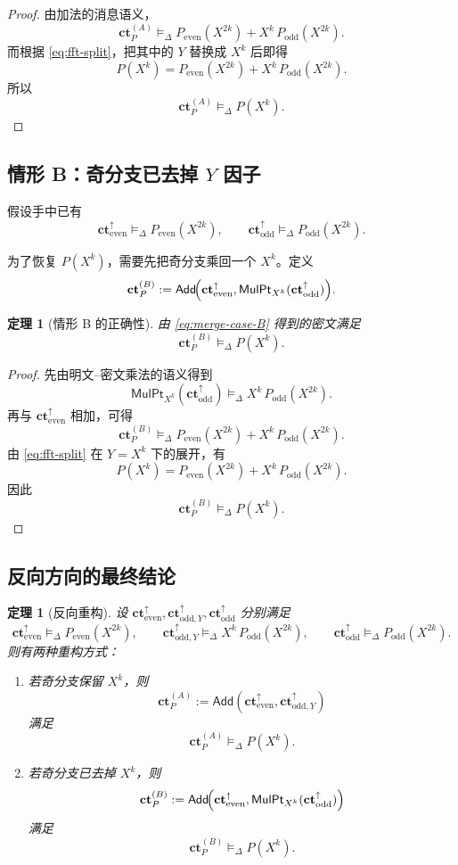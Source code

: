 \documentclass[11pt,a4paper]{ctexart}
\newcommand{\Add}{\mathsf{Add}}
\newcommand{\MulPt}[1]{\mathsf{MulPt}_{#1}}
\newcommand{\ct}{\mathbf{ct}}
\newcommand{\cte}{\mathbf{ct}_{\mathrm{even}}^{\uparrow}}
\newcommand{\ctoy}{\mathbf{ct}_{\mathrm{odd},Y}^{\uparrow}}
\newcommand{\cto}{\mathbf{ct}_{\mathrm{odd}}^{\uparrow}}
\newcommand{\rep}{\mathrel{\vDash_{\Delta}}}
\newtheorem{theorem}[definition]{定理}
\begin{document}
\begin{proof}
由加法的消息语义，
\[
\ct_P^{(A)}
\rep
P_{\mathrm{even}}(X^{2k})+X^k\,P_{\mathrm{odd}}(X^{2k}).
\]
而根据 \eqref{eq:fft-split}，把其中的 \(Y\) 替换成 \(X^k\) 后即得
\[
P(X^k)=P_{\mathrm{even}}(X^{2k})+X^k\,P_{\mathrm{odd}}(X^{2k}).
\]
所以
\[
\ct_P^{(A)} \rep P(X^k).
\]
\end{proof}

\subsection{情形 B：奇分支已去掉 \texorpdfstring{\(Y\)}{Y} 因子}

假设手中已有
\[
\cte \rep P_{\mathrm{even}}(X^{2k}),
\qquad
\cto \rep P_{\mathrm{odd}}(X^{2k}).
\]

为了恢复 \(P(X^k)\)，需要先把奇分支乘回一个 \(X^k\)。定义
\begin{equation}
\ct_P^{(B)}:=\Add\!\Bigl(\cte,\MulPt{X^k}(\cto)\Bigr). \label{eq:merge-case-B}
\end{equation}

\begin{theorem}[情形 B 的正确性]
由 \eqref{eq:merge-case-B} 得到的密文满足
\[
\ct_P^{(B)} \rep P(X^k).
\]
\end{theorem}

\begin{proof}
先由明文--密文乘法的语义得到
\[
\MulPt{X^k}(\cto)\rep X^k\,P_{\mathrm{odd}}(X^{2k}).
\]
再与 \(\cte\) 相加，可得
\[
\ct_P^{(B)}
\rep
P_{\mathrm{even}}(X^{2k})+X^k\,P_{\mathrm{odd}}(X^{2k}).
\]
由 \eqref{eq:fft-split} 在 \(Y=X^k\) 下的展开，有
\[
P(X^k)=P_{\mathrm{even}}(X^{2k})+X^k\,P_{\mathrm{odd}}(X^{2k}).
\]
因此
\[
\ct_P^{(B)} \rep P(X^k).
\]
\end{proof}

\subsection{反向方向的最终结论}

\begin{theorem}[反向重构]
设 \(\cte,\ctoy,\cto\) 分别满足
\[
\cte \rep P_{\mathrm{even}}(X^{2k}),
\qquad
\ctoy \rep X^k\,P_{\mathrm{odd}}(X^{2k}),
\qquad
\cto \rep P_{\mathrm{odd}}(X^{2k}).
\]
则有两种重构方式：

\begin{enumerate}[label=(\arabic*)]
    \item 若奇分支保留 \(X^k\)，则
    \[
    \ct_P^{(A)}:=\Add(\cte,\ctoy)
    \]
    满足
    \[
    \ct_P^{(A)} \rep P(X^k).
    \]

    \item 若奇分支已去掉 \(X^k\)，则
    \[
    \ct_P^{(B)}:=\Add\!\Bigl(\cte,\MulPt{X^k}(\cto)\Bigr)
    \]
    满足
    \[
    \ct_P^{(B)} \rep P(X^k).
    \]
\end{enumerate}
\end{theorem}
\end{document}
